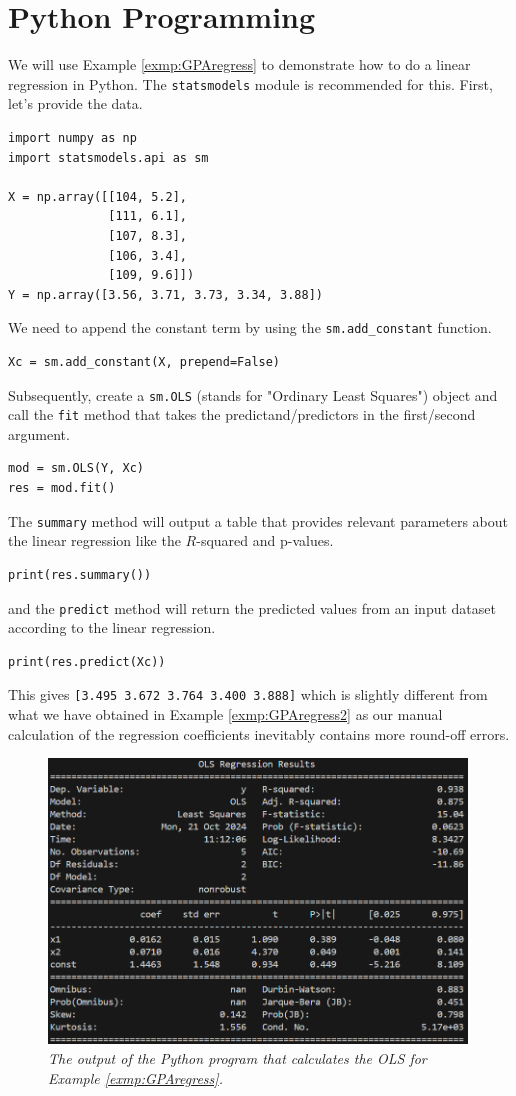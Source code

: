 \section{Python Programming}

We will use Example \ref{exmp:GPAregress} to demonstrate how to do a linear regression in Python. The \verb|statsmodels| module is recommended for this. First, let's provide the data.
\begin{lstlisting}
import numpy as np
import statsmodels.api as sm

X = np.array([[104, 5.2],
              [111, 6.1],
              [107, 8.3],
              [106, 3.4],
              [109, 9.6]]) 
Y = np.array([3.56, 3.71, 3.73, 3.34, 3.88])
\end{lstlisting}
We need to append the constant term by using the \verb|sm.add_constant| function.
\begin{lstlisting}
Xc = sm.add_constant(X, prepend=False)
\end{lstlisting}
Subsequently, create a \verb|sm.OLS| (stands for "Ordinary Least Squares") object and call the \verb|fit| method that takes the predictand/predictors in the first/second argument.
\begin{lstlisting}
mod = sm.OLS(Y, Xc)
res = mod.fit()
\end{lstlisting}
The \verb|summary| method will output a table that provides relevant parameters about the linear regression like the $R$-squared and p-values.
\begin{lstlisting}
print(res.summary())
\end{lstlisting}
and the \verb|predict| method will return the predicted values from an input dataset according to the linear regression.
\begin{lstlisting}
print(res.predict(Xc))    
\end{lstlisting}
This gives \verb|[3.495 3.672 3.764 3.400 3.888]| which is slightly different from what we have obtained in Example \ref{exmp:GPAregress2} as our manual calculation of the regression coefficients inevitably contains more round-off errors.
\begin{figure}[ht!]
    \centering
    \includegraphics[width=0.99\textwidth]{graphics/OLS_table.png}
    \caption{\textit{The output of the Python program that calculates the OLS for Example \ref{exmp:GPAregress}.}}
\end{figure}

